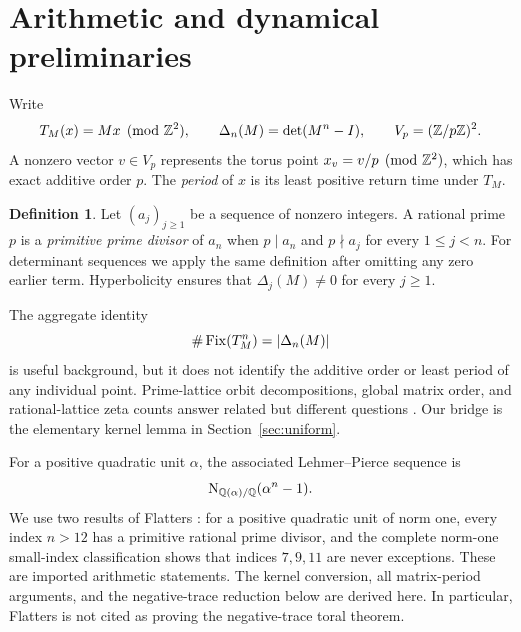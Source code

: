 \documentclass[11pt]{article}
\theoremstyle{definition}
\newtheorem{definition}[theorem]{Definition}
\theoremstyle{remark}
\begin{document}
\section{Arithmetic and dynamical preliminaries}
\label{sec:preliminaries}

Write
\begin{equation}
  T_M(x)=Mx\pmod{\mathbb{Z}^2},\qquad
  \Delta_n(M)=\det(M^n-I),\qquad
  V_p=(\mathbb{Z}/p\mathbb{Z})^2.
  \label{eq:notation}
\end{equation}
A nonzero vector \(v\in V_p\) represents the torus point
\(x_v=v/p\pmod{\mathbb{Z}^2}\), which has exact additive order \(p\).  The
\emph{period} of \(x\) is its least positive return time under \(T_M\).

\begin{definition}
Let \((a_j)_{j\ge1}\) be a sequence of nonzero integers.  A rational prime
\(p\) is a \emph{primitive prime divisor} of \(a_n\) when \(p\mid a_n\)
and \(p\nmid a_j\) for every \(1\le j<n\).  For determinant sequences we
apply the same definition after omitting any zero earlier term.  Hyperbolicity
ensures that \(\Delta_j(M)\ne0\) for every \(j\ge1\).
\end{definition}

The aggregate identity
\begin{equation}
  \#\operatorname{Fix}(T_M^n)=\lvert\Delta_n(M)\rvert
  \label{eq:fixed-count}
\end{equation}
is useful background, but it does not identify the additive order or least
period of any individual point.  Prime-lattice orbit decompositions, global
matrix order, and rational-lattice zeta counts answer related but different
questions \citep{Gaspari1994Arnold,DysonFalk1992Period,
BaakeRobertsWeiss2008Periodic}.  Our bridge is the elementary kernel lemma
in Section~\ref{sec:uniform}.

For a positive quadratic unit \(\alpha\), the associated Lehmer--Pierce
sequence is
\begin{equation}
  \operatorname{N}_{\mathbb{Q}(\alpha)/\mathbb{Q}}(\alpha^n-1).
\end{equation}
We use two results of Flatters \citep{Flatters2009Primitive}: for a positive
quadratic unit of norm one, every index \(n>12\) has a primitive rational
prime divisor, and the complete norm-one small-index classification shows
that indices \(7,9,11\) are never exceptions.  These are imported arithmetic
statements.  The kernel conversion, all matrix-period arguments, and the
negative-trace reduction below are derived here.  In particular, Flatters is
not cited as proving the negative-trace toral theorem.
\end{document}
